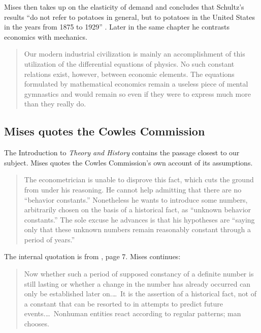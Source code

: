 \documentclass[12pt]{article}
\begin{document}
Mises then takes up \citet{Schultz1938} on the elasticity of demand and
concludes that Schultz's results ``do not refer to potatoes in general, but to
potatoes in the United States in the years from 1875 to 1929''
\citep[p.~349]{Mises1998HumanAction}.  Later in the same chapter he contrasts
economics with mechanics.

\begin{quote}
Our modern industrial civilization is mainly an accomplishment of this
utilization of the differential equations of physics.  No such constant
relations exist, however, between economic elements.  The equations formulated
by mathematical economics remain a useless piece of mental gymnastics and would
remain so even if they were to express much more than they really do.
\hfill \citep[p.~351]{Mises1998HumanAction}
\end{quote}

\subsection{Mises quotes the Cowles Commission}

The Introduction to \emph{Theory and History} contains the passage closest to
our subject.  Mises quotes the Cowles Commission's own account of its
assumptions.

\begin{quote}
The econometrician is unable to disprove this fact, which cuts the ground from
under his reasoning.  He cannot help admitting that there are no ``behavior
constants.''  Nonetheless he wants to introduce some numbers, arbitrarily chosen
on the basis of a historical fact, as ``unknown behavior constants.''  The sole
excuse he advances is that his hypotheses are ``saying only that these unknown
numbers remain reasonably constant through a period of years.''
\hfill \citep[p.~11]{Mises1957TheoryHistory}
\end{quote}

The internal quotation is from \citet{Cowles1949}, page 7.  Mises continues:

\begin{quote}
Now whether such a period of supposed constancy of a definite number is still
lasting or whether a change in the number has already occurred can only be
established later on.\ldots\ It is the assertion of a historical fact, not of a
constant that can be resorted to in attempts to predict future events.\ldots\
Nonhuman entities react according to regular patterns; man chooses.
\hfill \citep[p.~11]{Mises1957TheoryHistory}
\end{quote}
\end{document}
